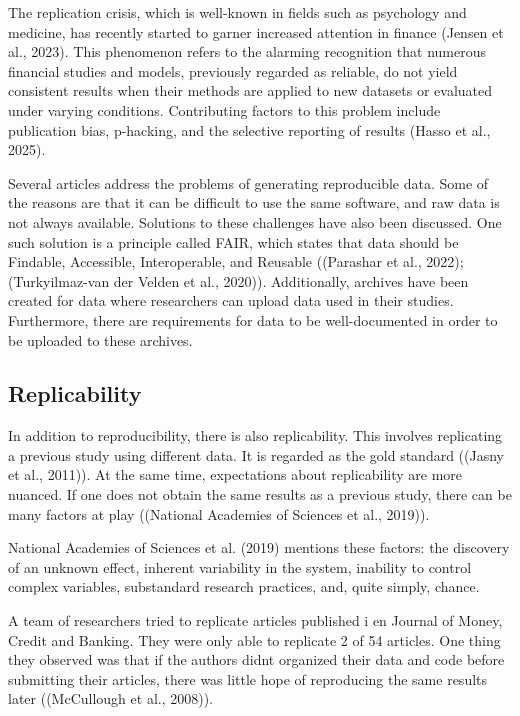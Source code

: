 \documentclass[
  a4paper,
]{article}
\begin{document}
The replication crisis, which is well-known in fields such as psychology
and medicine, has recently started to garner increased attention in
finance (Jensen et al., 2023). This phenomenon refers to the alarming
recognition that numerous financial studies and models, previously
regarded as reliable, do not yield consistent results when their methods
are applied to new datasets or evaluated under varying conditions.
Contributing factors to this problem include publication bias,
p-hacking, and the selective reporting of results (Hasso et al., 2025).

Several articles address the problems of generating reproducible data.
Some of the reasons are that it can be difficult to use the same
software, and raw data is not always available. Solutions to these
challenges have also been discussed. One such solution is a principle
called FAIR, which states that data should be Findable, Accessible,
Interoperable, and Reusable ((Parashar et al., 2022);(Turkyilmaz-van der
Velden et al., 2020)). Additionally, archives have been created for data
where researchers can upload data used in their studies. Furthermore,
there are requirements for data to be well-documented in order to be
uploaded to these archives.

\subsection{Replicability}\label{replicability}

In addition to reproducibility, there is also replicability. This
involves replicating a previous study using different data. It is
regarded as the gold standard ((Jasny et al., 2011)). At the same time,
expectations about replicability are more nuanced. If one does not
obtain the same results as a previous study, there can be many factors
at play ((National Academies of Sciences et al., 2019)).

National Academies of Sciences et al. (2019) mentions these factors: the
discovery of an unknown effect, inherent variability in the system,
inability to control complex variables, substandard research practices,
and, quite simply, chance.

A team of researchers tried to replicate articles published i en Journal
of Money, Credit and Banking. They were only able to replicate 2 of 54
articles. One thing they observed was that if the authors didnt
organized their data and code before submitting their articles, there
was little hope of reproducing the same results later ((McCullough et
al., 2008)).
\end{document}
